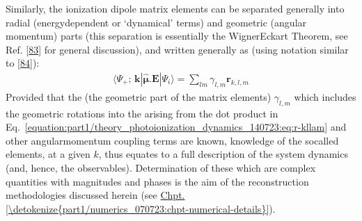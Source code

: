 \documentclass[letterpaper,table,10pt,english]{jupyterBook}
\begin{document}
\sphinxAtStartPar
Similarly, the ionization dipole matrix elements can be separated
generally into radial (energy\sphinxhyphen{}dependent or ‘dynamical’ terms) and
geometric (angular momentum) parts (this separation is essentially the
Wigner\sphinxhyphen{}Eckart Theorem, see Ref. {[}\hyperlink{cite.backmatter/bibliography:id990}{83}{]} for general discussion),
and written generally as (using notation similar to {[}\hyperlink{cite.backmatter/bibliography:id837}{84}{]}):
\begin{equation}\label{equation:part1/theory_photoionization_dynamics_140723:eq:r-kllam}
\begin{split}\langle\Psi_{+};\,\mathbf{k}|\hat{\boldsymbol{\mu}}.\boldsymbol{\mathbf{E}}|\Psi_{i}\rangle = \sum_{lm}\gamma_{l,m}\mathbf{r}_{k,l,m}
\end{split}
\end{equation}
\sphinxAtStartPar
Provided that the {\hyperref[\detokenize{backmatter/glossary:term-geometric-coupling-parameters}]{}} (the geometric part of the matrix elements) \(\gamma_{l,m}\) \sphinxhyphen{}
which includes the geometric rotations into the {\hyperref[\detokenize{backmatter/glossary:term-LF}]{}} arising from the dot
product in Eq. \eqref{equation:part1/theory_photoionization_dynamics_140723:eq:r-kllam} and other angular\sphinxhyphen{}momentum coupling terms \sphinxhyphen{} are
known, knowledge of the so\sphinxhyphen{}called {\hyperref[\detokenize{backmatter/glossary:term-radial-matrix-elements}]{}}
elements, at a given \(k\), thus equates to a full description of the
system dynamics (and, hence, the observables). Determination of these {\hyperref[\detokenize{backmatter/glossary:term-radial-matrix-elements}]{}} \sphinxhyphen{} which are complex quantities with magnitudes and phases \sphinxhyphen{} is the aim of the reconstruction methodologies discussed herein (see \hyperref[\detokenize{part1/numerics_070723:chpt-numerical-details}]{Chpt.\@ \ref{\detokenize{part1/numerics_070723:chpt-numerical-details}}}).
\end{document}
